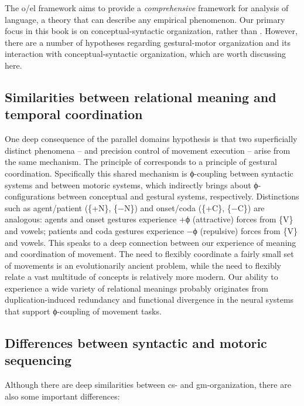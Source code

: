 The o/el framework aims to provide a \textit{comprehensive} framework for analysis of language, a theory that can describe any empirical phenomenon. Our primary focus in this book is on conceptual-syntactic organization, rather than . However, there are a number of hypotheses regarding gestural-motor organization and its interaction with conceptual-syntactic organization, which are worth discussing here.

\subsection{Similarities between relational meaning and temporal coordination}

One deep consequence of the parallel domains hypothesis is that two superficially distinct phenomena --  and precision control of movement execution -- arise from the same mechanism. The principle of  corresponds to a principle of gestural coordination. Specifically this shared mechanism is ϕ-coupling between syntactic systems and between motoric systems, which indirectly brings about ϕ-configurations between conceptual and gestural systems, respectively. Distinctions such as agent/patient (\{+N\}, \{−N\}) and onset/coda (\{+C\}, \{−C\}) are analogous: agents and onset gestures experience +ϕ (attractive) forces from \{V\} and vowels; patients and coda gestures experience −ϕ (repulsive) forces from \{V\} and vowels. This speaks to a deep connection between our experience of meaning and coordination of movement. The need to flexibly coordinate a fairly small set of movements is an evolutionarily ancient problem, while the need to flexibly relate a vast multitude of concepts is relatively more modern. Our ability to experience a wide variety of relational meanings probably originates from duplication-induced redundancy and functional divergence in the neural systems that support ϕ-coupling of movement tasks. 

\subsection{Differences between syntactic and motoric sequencing} 

Although there are deep similarities between cs- and gm-or\-ga\-ni\-za\-tion, there are also some important differences: 

